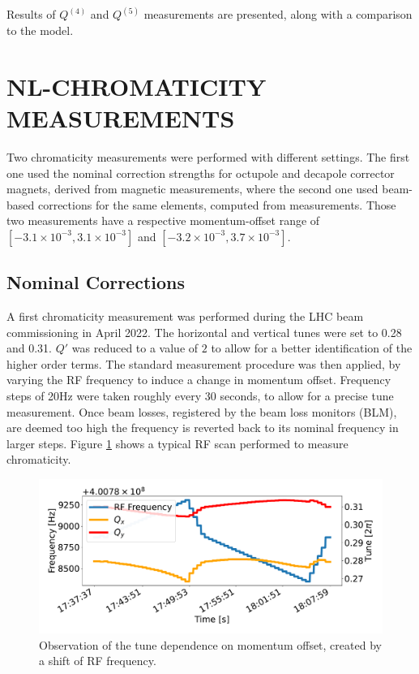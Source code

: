 Results of $Q^{(4)}$ and $Q^{(5)}$ measurements are presented, along with a comparison to the model.


\section{NL-CHROMATICITY MEASUREMENTS}

Two chromaticity measurements were performed with different settings. The first one used the 
nominal correction strengths for octupole and decapole corrector magnets, derived from magnetic measurements, where the second one used beam-based corrections for the same elements, computed from measurements. 
Those two measurements have a respective momentum-offset range of $[-3.1 \times 10^{-3}, 3.1 \times 10^{-3}]$ and $[-3.2 \times 10^{-3}, 3.7 \times 10^{-3}]$.

\subsection{Nominal Corrections}

A first chromaticity measurement was performed during the LHC beam commissioning in April 2022. The
horizontal and vertical tunes were set to 0.28 and 0.31. $Q'$ was reduced to a value of $2$ to allow
for a better identification of the higher order terms. The standard measurement procedure was then applied,    
by varying the RF frequency to induce a change in momentum offset. Frequency steps of 20Hz were taken roughly every
30 seconds, to allow for a precise tune measurement. Once beam losses, registered by the beam
loss monitors (BLM), are deemed too high the frequency is reverted back to its nominal frequency in
larger steps.
Figure \ref{rf_scan} shows a typical RF scan performed to measure chromaticity.

\begin{figure}[tbh]
    \centering
    \includegraphics[width=\columnwidth]{images/MOPL027_f1-1.pdf}
    \caption{Observation of the tune dependence on momentum offset, created by a shift of RF frequency.}
    \label{rf_scan}
\end{figure}

